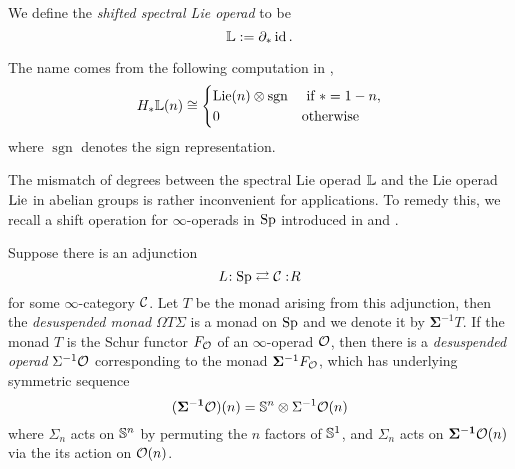 	\begin{definition}
	\label{Shifted Spectral Lie Operad}
	    	We define the \emph{shifted spectral Lie operad} to be
	    	$$
	    	{\mathbb{L}}:= \partial_* \operatorname{id}.
	    	$$
	\end{definition}

	The name comes from the following computation in \cite[Example 9.50]{ChingBar},
	$$
	H_{*}{\mathbb{L}}(n) \cong 	
	\begin{cases}
	\operatorname{Lie}(n) \otimes \operatorname{sgn}& \text{ if $*=1-n$},\\
	0 & \text{otherwise}
	\end{cases}
	$$	
	where $\operatorname{sgn}$ denotes the sign representation.


The mismatch of degrees between the spectral Lie operad ${\mathbb{L}}$ and the Lie operad $\operatorname{Lie}$ in abelian groups is rather inconvenient for applications. To remedy this, we recall a shift operation for $\infty$-operads in $\operatorname{Sp}$ introduced in \cite[\S 2.2.4.]{Hadrianphdthesis} and \cite[Section 3]{Camarena_mod2_free_spectral_Lie_algebra}.
\begin{definition}
    Suppose there is an adjunction
    $$L\negmedspace: \operatorname{Sp}\rightleftarrows {\mathcal{C}}:\negmedspace R$$
    for some $\infty$-category ${\mathcal{C}}$. Let $T$ be the monad arising from this adjunction, then the \emph{desuspended monad} $\Omega T \Sigma$ is a monad on $\operatorname{Sp}$ and we denote it by
     $\mathbf{\Sigma}^{-1}  T$.
	If the monad $T$ is the Schur functor $F_{{\mathcal{O}}}$ of an $\infty$-operad ${\mathcal{O}}$, then there is a \emph{desuspended operad} $\Sigma^{-1}{\mathcal{O}}$ corresponding to the monad $\mathbf{\Sigma}^{-1} F_{{\mathcal{O}}}$, which has underlying symmetric sequence 
	$$
	(\mathbf{\Sigma^{-1}} {\mathcal{O}} ) (n)= {\mathbb{S}}^{n}\otimes\Sigma^{-1} {\mathcal{O}}(n)
	$$
	where $\Sigma_n$ acts on ${\mathbb{S}}^{n}$ by permuting the $n$ factors of ${\mathbb{S}}^{1}$, and $\Sigma_n$ acts on $\mathbf{\Sigma^{-1}} {\mathcal{O}}(n)$ via the its action on ${\mathcal{O}}(n)$.
\end{definition}

